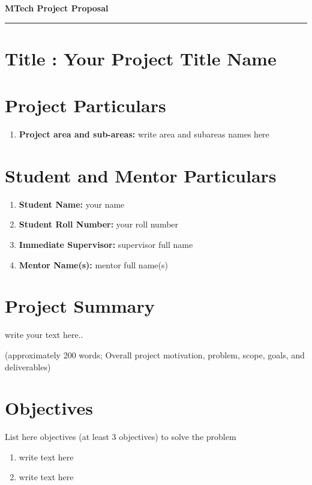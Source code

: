 \documentclass[12pt,a4paper]{article}
\begin{document}
\begin{center}
\textbf{MTech Project Proposal}
\end{center}

\par\noindent\rule{\textwidth}{0.5pt}

\vspace{\baselineskip}
\section{Title : \textnormal{Your Project Title Name}}

\section{Project Particulars}
\begin{enumerate} [label=(\Alph*)]
    \item \textbf{Project area and sub-areas:}  write area and subareas names here
\end{enumerate} 


\section{Student and Mentor Particulars}
\begin{enumerate} [label=(\Alph*)]
    \item \textbf{Student Name:} your name
    \item \textbf{Student Roll Number:} your roll number
    \item \textbf{Immediate Supervisor:} supervisor full name
    \item \textbf{Mentor Name(s):} mentor full name(s)
\end{enumerate} 

\section{Project Summary}
write your text here..

(approximately 200 words; Overall project motivation, problem, scope, goals, and deliverables)

\section{Objectives} \label{sec:Obj}
 List here objectives (at least 3 objectives) to solve the problem
\begin{enumerate}
\item write text here
\item write text here
\end{enumerate}
\end{document}
